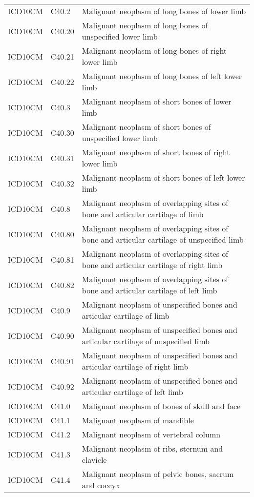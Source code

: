 \begin{longtable}{p{}p{}p{}}
  ICD10CM & C40.2 & Malignant neoplasm of long bones of lower limb \\ 
  ICD10CM & C40.20 & Malignant neoplasm of long bones of unspecified lower limb \\ 
  ICD10CM & C40.21 & Malignant neoplasm of long bones of right lower limb \\ 
  ICD10CM & C40.22 & Malignant neoplasm of long bones of left lower limb \\ 
  ICD10CM & C40.3 & Malignant neoplasm of short bones of lower limb \\ 
  ICD10CM & C40.30 & Malignant neoplasm of short bones of unspecified lower limb \\ 
  ICD10CM & C40.31 & Malignant neoplasm of short bones of right lower limb \\ 
  ICD10CM & C40.32 & Malignant neoplasm of short bones of left lower limb \\ 
  ICD10CM & C40.8 & Malignant neoplasm of overlapping sites of bone and articular cartilage of limb \\ 
  ICD10CM & C40.80 & Malignant neoplasm of overlapping sites of bone and articular cartilage of unspecified limb \\ 
  ICD10CM & C40.81 & Malignant neoplasm of overlapping sites of bone and articular cartilage of right limb \\ 
  ICD10CM & C40.82 & Malignant neoplasm of overlapping sites of bone and articular cartilage of left limb \\ 
  ICD10CM & C40.9 & Malignant neoplasm of unspecified bones and articular cartilage of limb \\ 
  ICD10CM & C40.90 & Malignant neoplasm of unspecified bones and articular cartilage of unspecified limb \\ 
  ICD10CM & C40.91 & Malignant neoplasm of unspecified bones and articular cartilage of right limb \\ 
  ICD10CM & C40.92 & Malignant neoplasm of unspecified bones and articular cartilage of left limb \\ 
  ICD10CM & C41.0 & Malignant neoplasm of bones of skull and face \\ 
  ICD10CM & C41.1 & Malignant neoplasm of mandible \\ 
  ICD10CM & C41.2 & Malignant neoplasm of vertebral column \\ 
  ICD10CM & C41.3 & Malignant neoplasm of ribs, sternum and clavicle \\ 
  ICD10CM & C41.4 & Malignant neoplasm of pelvic bones, sacrum and coccyx \\ 

\end{longtable}
